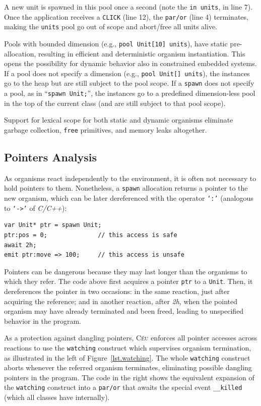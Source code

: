 \documentclass{sigplanconf}
\newcommand{\CEU}{\textsc{C\'{e}u}\xspace}
\newcommand{\code}[1] {{\small{\texttt{#1}}}}
\newcommand{\1}{\;}
\newcommand{\2}{\;\;}
\newcommand{\3}{\;\;\;}
\newcommand{\5}{\;\;\;\;\;}
\begin{document}
A new unit is spawned in this pool once a second (note the \code{in units}, in 
line 7).
Once the application receives a \code{CLICK} (line 12), the \code{par/or} (line 
4) terminates, making the \code{units} pool go out of scope and abort/free all 
units alive.

Pools with bounded dimension (e.g., \code{pool Unit[10] units}), have static 
pre-allocation, resulting in efficient and deterministic organism 
instantiation.
This opens the possibility for dynamic behavior also in constrained embedded 
systems.
%
If a pool does not specify a dimension (e.g., \code{pool Unit[] units}), the 
instances go to the heap but are still subject to the pool scope.
%
If a \code{spawn} does not specify a pool, as in ``\code{spawn Unit;}'', the 
instances go to a predefined dimension-less pool in the top of the current 
class (and are still subject to that pool scope).

Support for lexical scope for both static and dynamic organisms eliminate 
garbage collection, \code{free} primitives, and memory leaks altogether.

\subsection{Pointers Analysis}
\label{sec.orgs.refs}

As organisms react independently to the environment, it is often not necessary 
to hold pointers to them.
%
Nonetheless, a \code{spawn} allocation returns a pointer to the new organism, 
which can be later dereferenced with the operator \code{`:'} (analogous to 
\code{`->'} of \emph{C/C++}):

\begin{lstlisting}
var Unit* ptr = spawn Unit;
ptr:pos = 0;              // this access is safe
await 2h;
emit ptr:move => 100;     // this access is unsafe
\end{lstlisting}

Pointers can be dangerous because they may last longer than the organisms to 
which they refer.
%
The code above first acquires a pointer \code{ptr} to a \code{Unit}.
Then, it dereferences the pointer in two occasions:
in the same reaction, just after acquiring the reference;
and in another reaction, after \emph{2h}, when the pointed organism may have 
already terminated and been freed, leading to unspecified behavior in the 
program.

As a protection against dangling pointers, \CEU enforces all pointer accesses 
across reactions to use the \code{watching} construct which supervises organism 
termination, as illustrated in the left of Figure~\ref{lst.watching}.
%
The whole \code{watching} construct aborts whenever the referred organism 
terminates, eliminating possible dangling pointers in the program.
%
The code in the right shows the equivalent expansion of the \code{watching} 
construct into a \code{par/or} that awaits the special event \code{\_\_killed} 
(which all classes have internally).
\end{document}
